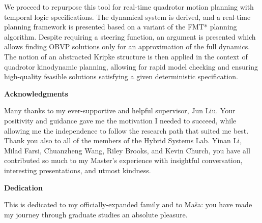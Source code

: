 We proceed to repurpose this tool for real-time quadrotor motion planning with temporal logic specifications. The dynamical system is derived, and a real-time planning framework is presented based on a variant of the FMT* planning algorithm. Despite requiring a steering function, an argument is presented which allows finding OBVP solutions only for an approximation of the full dynamics. The notion of an abstracted Kripke structure is then applied in the context of quadrotor kinodynamic planning, allowing for rapid model checking and ensuring high-quality feasible solutions satisfying a given deterministic \mucalc{} specification.

\cleardoublepage


\begin{center}\textbf{Acknowledgments}\end{center}

Many thanks to my ever-supportive and helpful supervisor, Jun Liu. Your positivity and guidance gave me the motivation I needed to succeed, while allowing me the independence to follow the research path that suited me best. Thank you also to all of the members of the Hybrid Systems Lab. Yinan Li, Milad Farsi, Chuanzheng Wang, Riley Brooks, and Kevin Church, you have all contributed so much to my Master's experience with insightful conversation, interesting presentations, and utmost kindness.
\cleardoublepage


\begin{center}\textbf{Dedication}\end{center}

This is dedicated to my officially-expanded family and to Ma\v{s}a: you have made my journey through graduate studies an absolute pleasure.
\cleardoublepage

\renewcommand\contentsname{Table of Contents}
\tableofcontents
\cleardoublepage
{}    %


\listoffigures
\cleardoublepage
{}		%

\printglossaries
\cleardoublepage
{}		%


